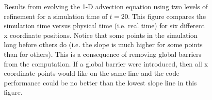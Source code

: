 \documentclass[prd,aps,showpacs,nofootinbib,floats,floatfix,twocolumn,letterpaper]{revtex4}
\begin{document}
\begin{figure}
\caption{Results from evolving the 1-D advection equation using two levels of refinement for a simulation time of $t=20$.
This figure compares the simulation time versus physical time (i.e. real time) for six different x coordinate 
positions.  Notice that some points in the simulation long before others do (i.e. the slope is much higher for some points
than for others).  This is 
a consequence of removing global barriers from the computation.  If a global barrier were introduced, then all
x coordinate points would like on the same line and the code performance could be no better 
than the lowest slope line in this figure.}
\label{fig:no_barriers}
\end{figure}

%
%
\end{document}
